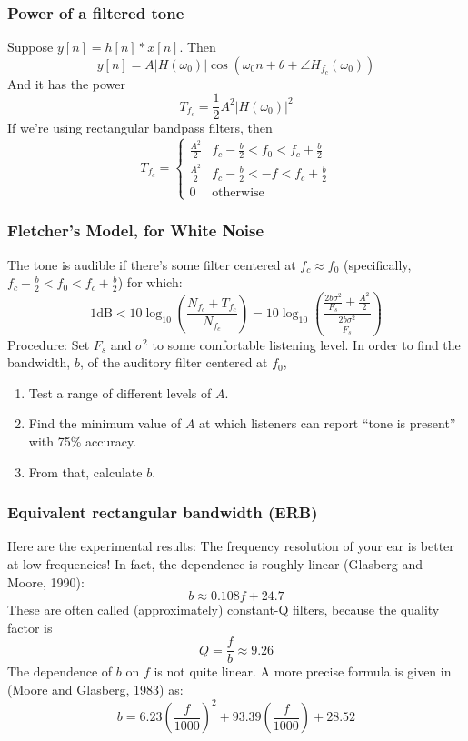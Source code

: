 \begin{frame}
  \frametitle{Power of a filtered tone}

  Suppose $y[n]=h[n]\ast x[n]$.  Then
  \[
  y[n] = A|H(\omega_0)|\cos\left(\omega_0 n+\theta+\angle H_{f_c}(\omega_0)\right)
  \]
  And it has the power
  \[
  T_{f_c} = \frac{1}{2}A^2 |H(\omega_0)|^2
  \]
  If we're using rectangular bandpass filters, then
  \[
  T_{f_c} = \begin{cases}
    \frac{A^2}{2} & f_c-\frac{b}{2}< f_0 <f_c+\frac{b}{2}\\
    \frac{A^2}{2} & f_c-\frac{b}{2} < -f < f_c+\frac{b}{2} \\
    0 & \mbox{otherwise}
  \end{cases}
  \]
\end{frame}

\begin{frame}
  \frametitle{Fletcher's Model, for White Noise}

  The tone is audible if there's some filter centered at $f_c\approx f_0$ (specifically,
  $f_c-\frac{b}{2}< f_0 <f_c+\frac{b}{2}$)  for which:
  \[
  1\mbox{dB} < 10\log_{10}\left(\frac{N_{f_c}+T_{f_c}}{N_{f_c}}\right)
  = 10\log_{10}\left(\frac{\frac{2b\sigma^2}{F_s}+\frac{A^2}{2}}{\frac{2b\sigma^2}{F_s}}\right)
  \]
  Procedure: Set $F_s$ and $\sigma^2$ to some comfortable listening
  level.  In order to find the bandwidth, $b$, of the auditory filter centered at $f_0$,
  \begin{enumerate}
  \item Test a range of different levels of $A$.
  \item Find the minimum value of $A$ at which listeners can report
    ``tone is present'' with 75\% accuracy.
  \item From that, calculate $b$.
  \end{enumerate}
\end{frame}

\begin{frame}
  \frametitle{Equivalent rectangular bandwidth (ERB)}

  Here are the experimental results: The frequency resolution of your
  ear is better at low frequencies!  In fact, the dependence is
  roughly linear (Glasberg and Moore, 1990):
  \[
  b \approx 0.108 f + 24.7
  \]
  These are often called (approximately) constant-Q filters, because
  the quality factor is
  \[
  Q = \frac{f}{b} \approx 9.26
  \]
  The dependence of $b$ on $f$ is not quite linear.  A more precise
  formula is given in (Moore and Glasberg, 1983) as:
  \[
  b = 6.23\left(\frac{f}{1000}\right)^2 + 93.39\left(\frac{f}{1000}\right)+28.52
  \]
\end{frame}

